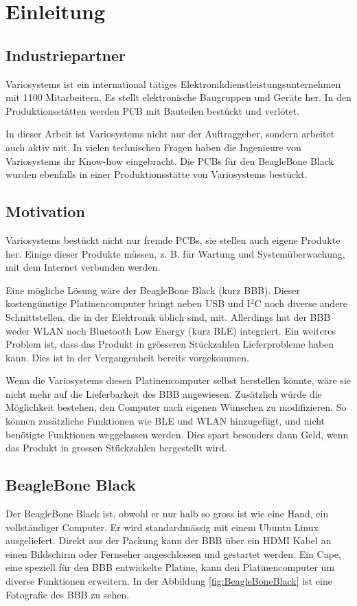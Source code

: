 \chapter{Einleitung}


\section{Industriepartner}
Variosystems ist ein international tätiges Elektronikdienstleistungsunternehmen mit 1100 Mitarbeitern. Es stellt elektronische Baugruppen und Geräte her. In den Produktionsstätten werden PCB mit Bauteilen bestückt und verlötet. 

In dieser Arbeit ist Variosystems nicht nur der Auftraggeber, sondern arbeitet auch aktiv mit. In vielen technischen Fragen haben die Ingenieure von Variosystems ihr Know-how eingebracht. Die PCBs für den BeagleBone Black wurden ebenfalls in einer Produktionsstätte von Variosystems bestückt.



\section{Motivation}
Variosystems bestückt nicht nur fremde PCBs, sie stellen auch eigene Produkte her. Einige dieser Produkte müssen, z. B. für Wartung und Systemüberwachung, mit dem Internet verbunden werden.

Eine mögliche Lösung wäre der BeagleBone Black (kurz BBB). Dieser kostengünstige Platinencomputer bringt neben USB und I$^2$C noch diverse andere Schnittstellen, die in der Elektronik üblich sind, mit. Allerdings hat der BBB weder WLAN noch Bluetooth Low Energy (kurz BLE) integriert. Ein weiteres Problem ist, dass das Produkt in grösseren Stückzahlen Lieferprobleme haben kann. Dies ist in der Vergangenheit bereits vorgekommen.

Wenn die Variosystems diesen Platinencomputer selbst herstellen könnte, wäre sie nicht mehr auf die Lieferbarkeit des BBB angewiesen. Zusätzlich würde die Möglichkeit bestehen, den Computer nach eigenen Wünschen zu modifizieren. So können zusätzliche Funktionen wie BLE und WLAN hinzugefügt, und nicht benötigte Funktionen weggelassen werden. Dies spart besonders dann Geld, wenn das Produkt in grossen Stückzahlen hergestellt wird.


\section{BeagleBone Black}
Der BeagleBone Black ist, obwohl er nur halb so gross ist wie eine Hand, ein vollständiger Computer. Er wird standardmässig mit einem Ubuntu Linux ausgeliefert. Direkt aus der Packung kann der BBB über ein HDMI Kabel an einen Bildschirm oder Fernseher angeschlossen und gestartet werden. Ein Cape, eine speziell für den BBB entwickelte Platine, kann den Platinencomputer um diverse Funktionen erweitern. In der Abbildung \ref{fig:BeagleBoneBlack} ist eine Fotografie des BBB zu sehen.

